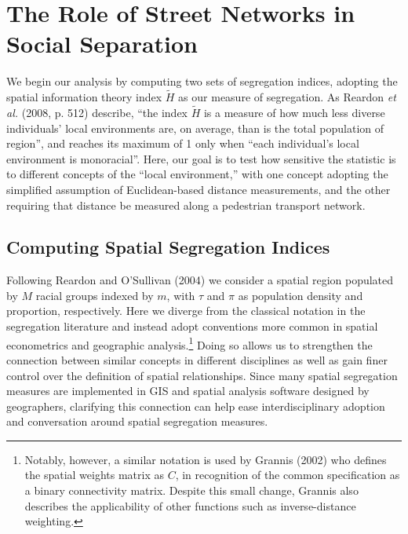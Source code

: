 \documentclass[
  10pt,
]{article}
\begin{document}
\hypertarget{the-role-of-street-networks-in-social-separation}{%
\section{The Role of Street Networks in Social
Separation}\label{the-role-of-street-networks-in-social-separation}}

We begin our analysis by computing two sets of segregation indices,
adopting the spatial information theory index \(\tilde{H}\) as our
measure of segregation. As Reardon \emph{et al.} (2008, p. 512)
describe, ``the index \(\tilde{H}\) is a measure of how much less
diverse individuals' local environments are, on average, than is the
total population of region'', and reaches its maximum of 1 only when
``each individual's local environment is monoracial''. Here, our goal is
to test how sensitive the statistic is to different concepts of the
``local environment,'' with one concept adopting the simplified
assumption of Euclidean-based distance measurements, and the other
requiring that distance be measured along a pedestrian transport
network.

\hypertarget{computing-spatial-segregation-indices}{%
\subsection{Computing Spatial Segregation
Indices}\label{computing-spatial-segregation-indices}}

Following Reardon and O'Sullivan (2004) we consider a spatial region
populated by \(M\) racial groups indexed by \(m\), with \(\tau\) and
\(\pi\) as population density and proportion, respectively. Here we
diverge from the classical notation in the segregation literature and
instead adopt conventions more common in spatial econometrics and
geographic analysis.\footnote{Notably, however, a similar notation is
  used by Grannis (2002) who defines the spatial weights matrix as
  \(C\), in recognition of the common specification as a binary
  connectivity matrix. Despite this small change, Grannis also describes
  the applicability of other functions such as inverse-distance
  weighting.} Doing so allows us to strengthen the connection between
similar concepts in different disciplines as well as gain finer control
over the definition of spatial relationships. Since many spatial
segregation measures are implemented in GIS and spatial analysis
software designed by geographers, clarifying this connection can help
ease interdisciplinary adoption and conversation around spatial
segregation measures.
\end{document}
